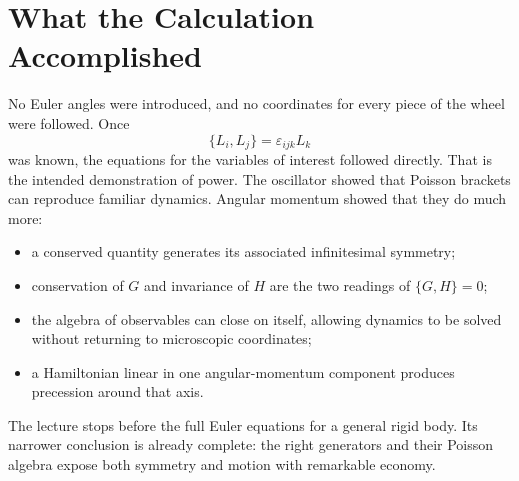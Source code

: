 \begin{classroomqa}
\end{classroomqa}

\begin{classroomqa}
\end{classroomqa}

\section{What the Calculation Accomplished}

No Euler angles were introduced, and no coordinates for every piece of the
wheel were followed.  Once
\[
  \{L_i,L_j\}=\varepsilon_{ijk}L_k
\]
was known, the equations for the variables of interest followed directly.
That is the intended demonstration of power.  The oscillator showed that
Poisson brackets can reproduce familiar dynamics.  Angular momentum showed
that they do much more:
\begin{itemize}
  \item a conserved quantity generates its associated infinitesimal symmetry;
  \item conservation of \(G\) and invariance of \(H\) are the two readings of
  \(\{G,H\}=0\);
  \item the algebra of observables can close on itself, allowing dynamics to be
  solved without returning to microscopic coordinates;
  \item a Hamiltonian linear in one angular-momentum component produces
  precession around that axis.
\end{itemize}
The lecture stops before the full Euler equations for a general rigid body.
Its narrower conclusion is already complete: the right generators and their
Poisson algebra expose both symmetry and motion with remarkable economy.

